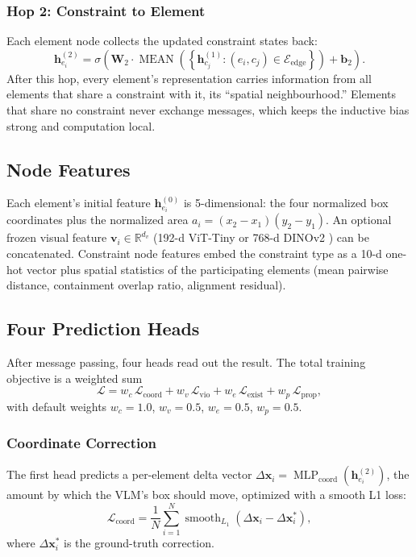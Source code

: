 \documentclass[11pt, letterpaper]{article}
\begin{document}
\subsubsection{Hop 2: Constraint to Element}
Each element node collects the updated constraint states back:
\begin{equation}
\mathbf{h}_{e_i}^{(2)}=\sigma\!\left(\mathbf{W}_2\cdot
\operatorname{MEAN}\!\left(\left\{\mathbf{h}_{c_j}^{(1)}:
(e_i,c_j)\in\mathcal{E}_{\text{edge}}\right\}\right)+\mathbf{b}_2\right).
\label{eq:hop2}
\end{equation}
After this hop, every element's representation carries information from all
elements that share a constraint with it, its ``spatial neighbourhood.''
Elements that share no constraint never exchange messages, which keeps the
inductive bias strong and computation local.

\subsection{Node Features}
Each element's initial feature $\mathbf{h}_{e_i}^{(0)}$ is 5-dimensional: the
four normalized box coordinates plus the normalized area
$a_i=(x_2-x_1)(y_2-y_1)$. An optional frozen visual feature
$\mathbf{v}_i\in\mathbb{R}^{d_v}$ (192-d ViT-Tiny or 768-d
DINOv2 \cite{oquab2024dinov2}) can be concatenated. Constraint node features
embed the constraint type as a 10-d one-hot vector plus spatial statistics of
the participating elements (mean pairwise distance, containment overlap
ratio, alignment residual).

\subsection{Four Prediction Heads}
After message passing, four heads read out the result. The total training
objective is a weighted sum
\begin{equation}
\mathcal{L}=w_c\,\mathcal{L}_{\text{coord}}+w_v\,\mathcal{L}_{\text{vio}}
+w_e\,\mathcal{L}_{\text{exist}}+w_p\,\mathcal{L}_{\text{prop}},
\label{eq:loss}
\end{equation}
with default weights $w_c{=}1.0$, $w_v{=}0.5$, $w_e{=}0.5$, $w_p{=}0.5$.

\subsubsection{Coordinate Correction}
The first head predicts a per-element delta vector
$\Delta\mathbf{x}_i=\operatorname{MLP}_{\text{coord}}(\mathbf{h}_{e_i}^{(2)})$,
the amount by which the VLM's box should move, optimized with a smooth
L1 loss:
\begin{equation}
\mathcal{L}_{\text{coord}}=\frac{1}{N}\sum_{i=1}^{N}
\operatorname{smooth}_{L_1}(\Delta\mathbf{x}_i-\Delta\mathbf{x}_i^*),
\label{eq:lcoord}
\end{equation}
where $\Delta\mathbf{x}_i^*$ is the ground-truth correction.
\end{document}
